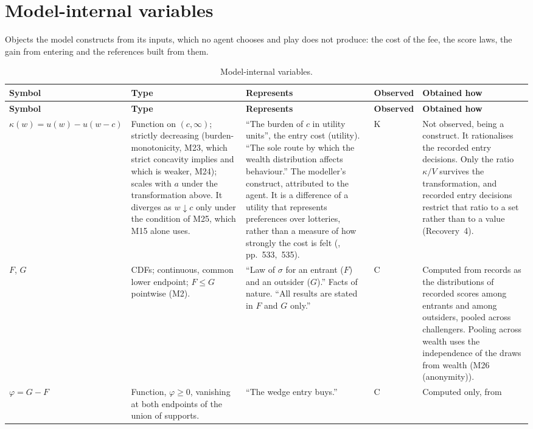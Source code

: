 \documentclass[11pt]{article}
\begin{document}
\section*{Model-internal variables}

Objects the model constructs from its inputs, which no agent chooses and play does not produce:
the cost of the fee, the score laws, the gain from entering and the references built from them.

\footnotesize
\begin{longtable}{@{}P{1.9cm}P{2.4cm}P{4.5cm}P{1.7cm}P{4.7cm}@{}}
\caption{Model-internal variables.}\\
\toprule
\textbf{Symbol} & \textbf{Type} & \textbf{Represents} & \textbf{Observed} & \textbf{Obtained how} \\
\midrule
\endfirsthead
\toprule
\textbf{Symbol} & \textbf{Type} & \textbf{Represents} & \textbf{Observed} & \textbf{Obtained how} \\
\midrule
\endhead
\bottomrule
\endfoot
$\kappa(w)=u(w)-u(w-c)$ & Function on $(c,\infty)$; strictly decreasing
  (burden-monotonicity, M23, which strict concavity implies and which is
  weaker, M24); scales with $a$ under the transformation above. It diverges
  as $w\downarrow c$ only under the condition of M25, which M15 alone uses. & ``The burden of $c$ in utility units'', the entry
  cost (utility). ``The sole route by which the wealth distribution affects
  behaviour.'' The modeller's construct, attributed to the agent. It is a
  difference of a utility that represents preferences over lotteries, rather
  than a measure of how strongly the cost is felt (\citealp{Schoemaker1982},
  pp.~533,~535). & K & Not observed, being a construct. It rationalises the
  recorded entry decisions. Only the ratio $\kappa/V$ survives the
  transformation, and recorded entry decisions restrict that ratio to a set
  rather than to a value (Recovery~4). \\ \addlinespace
$F$, $G$ & CDFs; continuous, common lower endpoint; $F\le G$ pointwise
  (M2). & ``Law of $\sigma$ for an entrant ($F$) and an outsider ($G$).'' Facts
  of nature. ``All results are stated in $F$ and $G$ only.'' & C & Computed from
  records as the distributions of recorded scores among entrants and among
  outsiders, pooled across challengers. Pooling across wealth uses the
  independence of the draws from wealth (M26 (anonymity)). \\ \addlinespace
$\varphi=G-F$ & Function, $\varphi\ge0$, vanishing at both endpoints of the
  union of supports. & ``The wedge entry buys.'' & C & Computed only, from

\end{longtable}
\end{document}
